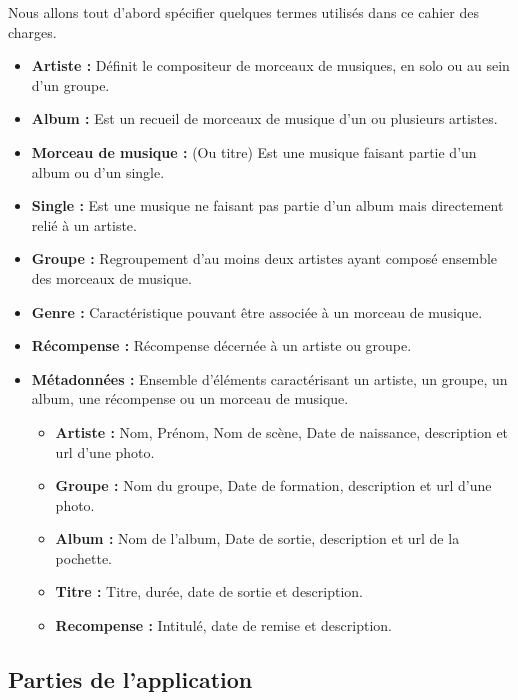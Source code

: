     \begin{paragraphe}
      Nous allons tout d'abord spécifier quelques termes utilisés dans ce cahier des
      charges.
      \begin{itemize}
        \item \textbf{Artiste :} Définit le compositeur de morceaux de musiques, en solo ou au sein d'un groupe.
        \item \textbf{Album :} Est un recueil de morceaux de musique d'un ou
          plusieurs artistes.
        \item \textbf{Morceau de musique :} (Ou titre) Est une musique faisant partie d'un
          album ou d'un single.
        \item \textbf{Single :} Est une musique ne faisant pas partie d'un album
          mais directement relié à un artiste.
        \item \textbf{Groupe :} Regroupement d'au moins deux artistes ayant composé ensemble des morceaux de musique.
        \item \textbf{Genre :} Caractéristique pouvant être associée à un morceau de musique.
        \item \textbf{Récompense :} Récompense décernée à un artiste ou groupe.
        \item \textbf{Métadonnées :} Ensemble d'éléments caractérisant un artiste, un groupe, un album, une récompense ou un morceau de musique.
        \begin{itemize}
            \item \textbf{Artiste :} Nom, Prénom, Nom de scène, Date de naissance, description et url d'une photo.
            \item \textbf{Groupe :} Nom du groupe, Date de formation, description et url d'une photo.
            \item \textbf{Album :} Nom de l'album, Date de sortie, description et url de la pochette.
            \item \textbf{Titre :} Titre, durée, date de sortie et description.
            \item \textbf{Recompense :} Intitulé, date de remise et description.
        \end{itemize}
      \end{itemize}
    \end{paragraphe}

  \subsection{Parties de l'application}

